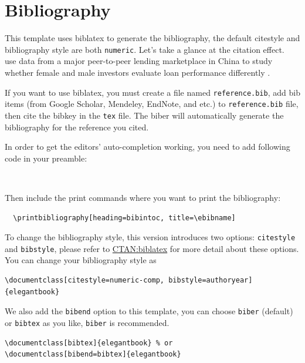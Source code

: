 \documentclass[11pt,bibend=bibtex]{elegantbook}
\begin{document}
\section{Bibliography}

This template uses biblatex to generate the bibliography, the default citestyle and bibliography style are both \lstinline{numeric}. Let's take a glance at the citation effect. ~\cite{en1} use data from a major peer-to-peer lending \cite{en3} marketplace in China to study whether female and male investors evaluate loan performance differently \parencite{en2}. 

If you want to use biblatex, you must create a file named \lstinline{reference.bib}, add bib items (from Google Scholar, Mendeley, EndNote, and etc.) to \lstinline{reference.bib} file, then cite the bibkey in the \lstinline{tex} file. The biber will automatically generate the bibliography for the reference you cited.

In order to get the editors' auto-completion working, you need to add following code in your preamble:

\begin{lstlisting}
  
\end{lstlisting}

Then include the print commands where you want to print the bibliography:
\begin{lstlisting}
  \printbibliography[heading=bibintoc, title=\ebibname]
\end{lstlisting}




To change the bibliography style, this version introduces two options: \lstinline{citestyle} and \lstinline{bibstyle}, please refer to \href{https://ctan.org/pkg/biblatex}{CTAN:biblatex} for more detail about these options. You can change your bibliography style as

\begin{lstlisting}
\documentclass[citestyle=numeric-comp, bibstyle=authoryear]{elegantbook} 
\end{lstlisting}

We also add the \lstinline{bibend} option to this template, you can choose \lstinline{biber} (default) or \lstinline{bibtex} as you like, \lstinline{biber} is recommended.

\begin{lstlisting}
\documentclass[bibtex]{elegantbook} % or
\documentclass[bibend=bibtex]{elegantbook}
\end{lstlisting}
\end{document}
